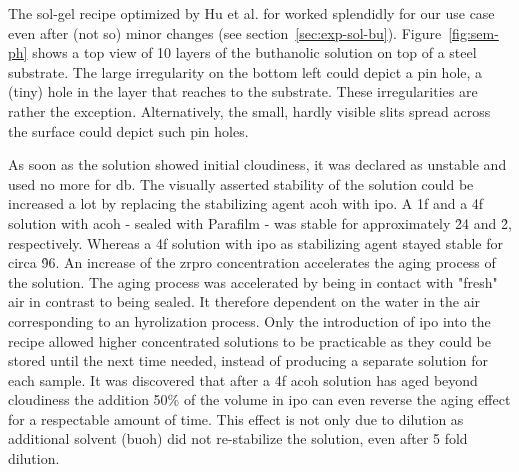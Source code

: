 The sol-gel recipe optimized by Hu et al.\cite{Hu2016} for  worked splendidly for our use case even after (not so) minor changes (see section~\ref{sec:exp-sol-bu}). 
%
Figure~\ref{fig:sem-ph} shows a top view of 10 layers of the buthanolic solution on top of a steel substrate. 
The large irregularity on the bottom left could depict a pin hole, a (tiny) hole in the layer that reaches to the substrate. 
These irregularities are rather the exception. 
Alternatively, the small, hardly visible slits spread across the surface could depict such pin holes. 

As soon as the solution showed initial cloudiness, it was declared as unstable and used no more for \gls{db}. %
The visually asserted stability of the solution could be increased a lot by replacing the stabilizing agent \gls{acoh} with \gls{ipo}.
A \gls{1f} and a \gls{4f} solution with \gls{acoh} - sealed with Parafilm - was stable for approximately \h{24} and \h{2}, respectively.
Whereas a \gls{4f} solution with \gls{ipo} as stabilizing agent stayed stable for circa \h{96}. 
An increase of the \gls{zrpro} concentration accelerates the aging process of the solution.
The aging process was accelerated by being in contact with "fresh" air in contrast to being sealed. 
It therefore dependent on the water in the air corresponding to an hyrolization process\cite{Hu2016}.
%
Only the introduction of \gls{ipo} into the recipe allowed higher concentrated solutions to be practicable 
as they could be stored until the next time needed, instead of producing a separate solution for each sample.
%
It was discovered that after a \gls{4f} \gls{acoh} solution has aged beyond cloudiness the addition 50\% of the volume in \gls{ipo} can even reverse the aging effect for a respectable amount of time. 
This effect is not only due to dilution as additional solvent (\gls{buoh}) did not re-stabilize the solution, 
even after 5 fold dilution. 

